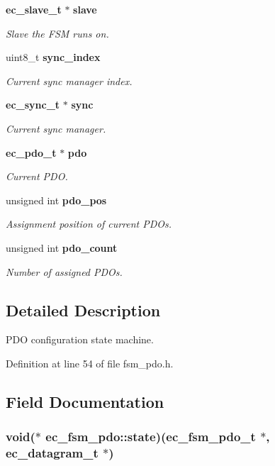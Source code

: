 \begin{DoxyCompactItemize}
{\bf ec\-\_\-slave\-\_\-t} $\ast$ {\bf slave}
\begin{DoxyCompactList}\small\item\em \-Slave the \-F\-S\-M runs on. \end{DoxyCompactList}\item 
uint8\-\_\-t {\bf sync\-\_\-index}
\begin{DoxyCompactList}\small\item\em \-Current sync manager index. \end{DoxyCompactList}\item 
{\bf ec\-\_\-sync\-\_\-t} $\ast$ {\bf sync}
\begin{DoxyCompactList}\small\item\em \-Current sync manager. \end{DoxyCompactList}\item 
{\bf ec\-\_\-pdo\-\_\-t} $\ast$ {\bf pdo}
\begin{DoxyCompactList}\small\item\em \-Current \-P\-D\-O. \end{DoxyCompactList}\item 
unsigned int {\bf pdo\-\_\-pos}
\begin{DoxyCompactList}\small\item\em \-Assignment position of current \-P\-D\-Os. \end{DoxyCompactList}\item 
unsigned int {\bf pdo\-\_\-count}
\begin{DoxyCompactList}\small\item\em \-Number of assigned \-P\-D\-Os. \end{DoxyCompactList}\end{DoxyCompactItemize}


\subsection{\-Detailed \-Description}
\-P\-D\-O configuration state machine. 

\-Definition at line 54 of file fsm\-\_\-pdo.\-h.



\subsection{\-Field \-Documentation}
\subsubsection[{state}]{\setlength{\rightskip}{0pt plus 5cm}void($\ast$ {\bf ec\-\_\-fsm\-\_\-pdo\-::state})({\bf ec\-\_\-fsm\-\_\-pdo\-\_\-t} $\ast$, {\bf ec\-\_\-datagram\-\_\-t} $\ast$)}\label{structec__fsm__pdo_a0395eeb4608437fc422ddb7df18ddf95}


